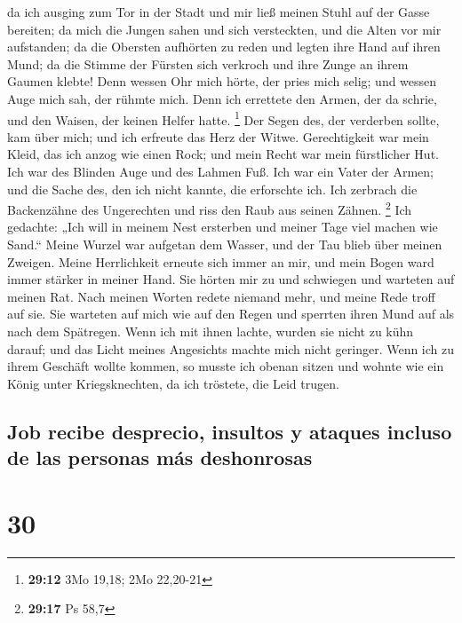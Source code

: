  da ich ausging zum Tor in der Stadt und mir ließ meinen
Stuhl auf der Gasse bereiten;  da mich die Jungen sahen
und sich versteckten, und die Alten vor mir aufstanden; 
da die Obersten aufhörten zu reden und legten ihre Hand auf ihren Mund;
 da die Stimme der Fürsten sich verkroch und ihre Zunge
an ihrem Gaumen klebte!  Denn wessen Ohr mich hörte, der
pries mich selig; und wessen Auge mich sah, der rühmte mich.
 Denn ich errettete den Armen, der da schrie, und den
Waisen, der keinen Helfer hatte. \footnote{\textbf{29:12} 3Mo 19,18; 2Mo
  22,20-21}  Der Segen des, der verderben sollte, kam
über mich; und ich erfreute das Herz der Witwe. 
Gerechtigkeit war mein Kleid, das ich anzog wie einen Rock; und mein
Recht war mein fürstlicher Hut.  Ich war des Blinden Auge
und des Lahmen Fuß.  Ich war ein Vater der Armen; und die
Sache des, den ich nicht kannte, die erforschte ich.  Ich
zerbrach die Backenzähne des Ungerechten und riss den Raub aus seinen
Zähnen. \footnote{\textbf{29:17} Ps 58,7}  Ich gedachte:
„Ich will in meinem Nest ersterben und meiner Tage viel machen wie
Sand.``  Meine Wurzel war aufgetan dem Wasser, und der
Tau blieb über meinen Zweigen.  Meine Herrlichkeit
erneute sich immer an mir, und mein Bogen ward immer stärker in meiner
Hand.  Sie hörten mir zu und schwiegen und warteten auf
meinen Rat.  Nach meinen Worten redete niemand mehr, und
meine Rede troff auf sie.  Sie warteten auf mich wie auf
den Regen und sperrten ihren Mund auf als nach dem Spätregen.
 Wenn ich mit ihnen lachte, wurden sie nicht zu kühn
darauf; und das Licht meines Angesichts machte mich nicht geringer.
 Wenn ich zu ihrem Geschäft wollte kommen, so musste ich
obenan sitzen und wohnte wie ein König unter Kriegsknechten, da ich
tröstete, die Leid trugen.

\hypertarget{job-recibe-desprecio-insultos-y-ataques-incluso-de-las-personas-muxe1s-deshonrosas}{%
\subsection{Job recibe desprecio, insultos y ataques incluso de las
personas más
deshonrosas}\label{job-recibe-desprecio-insultos-y-ataques-incluso-de-las-personas-muxe1s-deshonrosas}}

\hypertarget{section-29}{%
\section{30}\label{section-29}}

